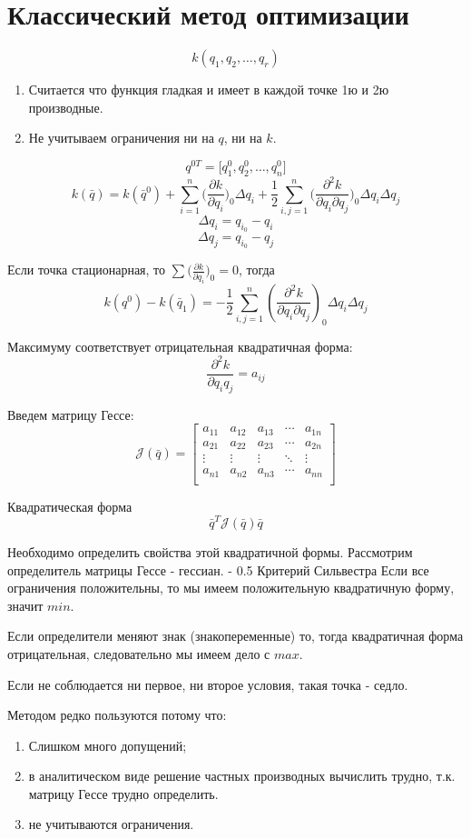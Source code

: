 \documentclass[12pt,a5paper]{scrbook}
\makeatletter
\renewcommand\paragraph{\@startsection{paragraph}{4}{0mm}%
{-\baselineskip} %
{0.5\baselineskip} %
{\normalfont\bfseries}}%
\makeatother
\begin{document}
  \section{Классический метод оптимизации}
  $$k(q_1, q_2, \ldots, q_r)$$
  \begin{enumerate}
  	\item Считается что функция гладкая и имеет в каждой точке 1ю и 2ю производные.
  	\item Не учитываем ограничения ни на $q$, ни на $k$.
  \end{enumerate}
  $$q^{0T} = \Big[q_1^0, q_2^0, \ldots, q_n^0\Big]$$
  $$k(\bar{q}) = k(\bar{q}^0) + \sum_{i = 1}^n\Bigg(\frac{\partial k}{\partial q_i}\Bigg)_0\Delta q_i + \frac{1}{2}\sum^n_{i, j = 1}\Bigg(\frac{\partial^2 k}{\partial q_i\partial q_j}\Bigg)_0\Delta q_i\Delta q_j$$
  $$\Delta q_i = q_{i_0} - q_i$$
  $$\Delta q_j = q_{i_0} - q_j$$
  \par
  Если точка стационарная, то $\sum\Big(\frac{\partial k}{\partial q_i}\Big)_0 = 0$, тогда
  $$k(q^0) - k(\bar{q}_1) = - \frac{1}{2}\sum_{i, j = 1}^n\left(\frac{\partial^2k}{\partial q_i\partial q_j}\right)_0 \Delta q_i\Delta q_j$$
  \par
  Максимуму соответствует отрицательная квадратичная форма:
  $$\frac{\partial^2k}{\partial q_i q_j} = a_{ij}$$
  \par
  Введем матрицу Гессе:
  $$
  	\mathcal{J}(\bar{q}) =
  	\begin{bmatrix}
  	  a_{11} & a_{12} & a_{13} & \cdots & a_{1n}\\
  	  a_{21} & a_{22} & a_{23} & \cdots & a_{2n}\\
  	  \vdots & \vdots & \vdots & \ddots & \vdots\\
  	  a_{n1} & a_{n2} & a_{n3} & \cdots & a_{nn}\\
  	\end{bmatrix}
  $$
  \par
  Квадратическая форма
  $$\bar{q}^T\mathcal{J}(\bar{q})\bar{q}$$
  \par
  Необходимо определить свойства этой квадратичной формы. Рассмотрим определитель матрицы Гессе - гессиан.
  \paragraph{Критерий Сильвестра}
  Если все ограничения положительны, то мы имеем положительную квадратичную форму, значит $min$.
  \par
  Если определители меняют знак (знакопеременные) то, тогда квадратичная форма отрицательная, следовательно мы имеем дело с $max$.
  \par
  Если не соблюдается ни первое, ни второе условия, такая точка - седло.
  \par
  Методом редко пользуются потому что:
  \begin{enumerate}
  	\item Слишком много допущений;
  	\item в аналитическом виде решение частных производных вычислить трудно, т.к. матрицу Гессе трудно определить.
  	\item не учитываются ограничения.
  \end{enumerate}
\end{document}

